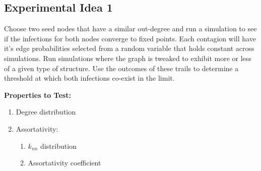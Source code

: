 \documentclass[11pt]{article}
\begin{document}
\subsection{Experimental Idea 1}

Choose two seed nodes that have a similar out-degree and run a
simulation to see if the infections for both nodes converge to 
fixed points. Each contagion will have it's edge probabilities
selected from a random variable that holds constant across simulations.
Run simulations where the graph is tweaked  to exhibit more or less
of a given type of structure. Use the outcomes of these trails to
determine a threshold at which both infections co-exist in the
limit.

\medskip

\noindent
\textbf{Properties to Test:}

 \begin{enumerate}
    \item Degree distribution
    \item Assortativity:
       \begin{enumerate}
            \item $k_{nn}$ distribution
            \item Assortativity coefficient
        \end{enumerate}
    \end{enumerate}
\end{document}

